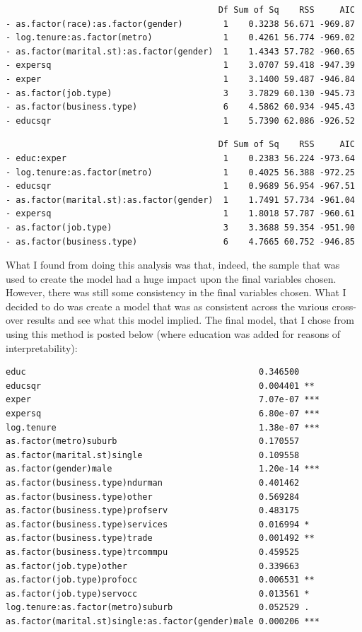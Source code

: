 \documentclass[12pt,a4paper,twoside]{article}
\begin{document}
\begin{verbatim}
                                          Df Sum of Sq    RSS     AIC
- as.factor(race):as.factor(gender)        1    0.3238 56.671 -969.87
- log.tenure:as.factor(metro)              1    0.4261 56.774 -969.02
- as.factor(marital.st):as.factor(gender)  1    1.4343 57.782 -960.65
- expersq                                  1    3.0707 59.418 -947.39
- exper                                    1    3.1400 59.487 -946.84
- as.factor(job.type)                      3    3.7829 60.130 -945.73
- as.factor(business.type)                 6    4.5862 60.934 -945.43
- educsqr                                  1    5.7390 62.086 -926.52
\end{verbatim}

\begin{verbatim}
                                          Df Sum of Sq    RSS     AIC
- educ:exper                               1    0.2383 56.224 -973.64
- log.tenure:as.factor(metro)              1    0.4025 56.388 -972.25
- educsqr                                  1    0.9689 56.954 -967.51
- as.factor(marital.st):as.factor(gender)  1    1.7491 57.734 -961.04
- expersq                                  1    1.8018 57.787 -960.61
- as.factor(job.type)                      3    3.3688 59.354 -951.90
- as.factor(business.type)                 6    4.7665 60.752 -946.85
\end{verbatim} 

What I found from doing this analysis was that, indeed, the sample that was used to create the model had a huge impact upon the final variables chosen. However, there was still some consistency in the final variables chosen. What I decided to do was create a model that was as consistent across the various cross-over results and see what this model implied. The final model, that I chose from using this method is posted below (where education was added for reasons of interpretability):

\begin{verbatim}
educ                                              0.346500    
educsqr                                           0.004401 ** 
exper                                             7.07e-07 ***
expersq                                           6.80e-07 ***
log.tenure                                        1.38e-07 ***
as.factor(metro)suburb                            0.170557    
as.factor(marital.st)single                       0.109558    
as.factor(gender)male                             1.20e-14 ***
as.factor(business.type)ndurman                   0.401462    
as.factor(business.type)other                     0.569284    
as.factor(business.type)profserv                  0.483175    
as.factor(business.type)services                  0.016994 *  
as.factor(business.type)trade                     0.001492 ** 
as.factor(business.type)trcommpu                  0.459525    
as.factor(job.type)other                          0.339663    
as.factor(job.type)profocc                        0.006531 ** 
as.factor(job.type)servocc                        0.013561 *  
log.tenure:as.factor(metro)suburb                 0.052529 .  
as.factor(marital.st)single:as.factor(gender)male 0.000206 ***
\end{verbatim}
\end{document}

